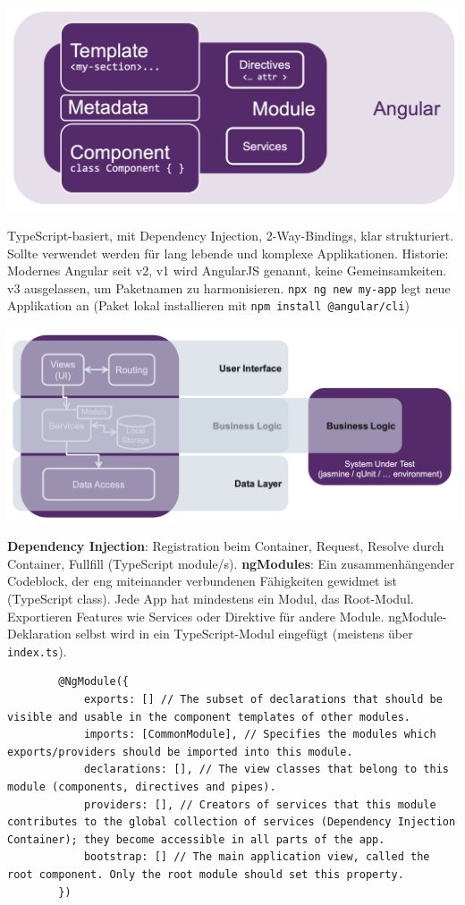 \documentclass[10pt,landscape]{article}
\begin{document}
\begin{multicols}{2}
        \includegraphics[width=\linewidth]{base_angular}

        TypeScript-basiert, mit Dependency Injection, 2-Way-Bindings, klar strukturiert.
        Sollte verwendet werden für lang lebende und komplexe Applikationen.
        Historie: Modernes Angular seit v2, v1 wird AngularJS genannt, keine Gemeinsamkeiten.
        v3 ausgelassen, um Paketnamen zu harmonisieren.
        \lstinline{npx ng new my-app} legt neue Applikation an (Paket lokal installieren mit \lstinline{npm install @angular/cli})

        \includegraphics[width=\linewidth]{angular_logical_layers}

        \textbf{Dependency Injection}: Registration beim Container, Request, Resolve durch Container, Fullfill (TypeScript module/s).
        \textbf{ngModules}: Ein zusammenhängender Codeblock, der eng miteinander verbundenen Fähigkeiten gewidmet ist (TypeScript class).
        Jede App hat mindestens ein Modul, das Root-Modul.
        Exportieren Features wie Services oder Direktive für andere Module.
        ngModule-Deklaration selbst wird in ein TypeScript-Modul eingefügt (meistens über \lstinline{index.ts}).

        \begin{lstlisting}
        @NgModule({
            exports: [] // The subset of declarations that should be visible and usable in the component templates of other modules.
            imports: [CommonModule], // Specifies the modules which exports/providers should be imported into this module.
            declarations: [], // The view classes that belong to this module (components, directives and pipes).
            providers: [], // Creators of services that this module contributes to the global collection of services (Dependency Injection Container); they become accessible in all parts of the app.
            bootstrap: [] // The main application view, called the root component. Only the root module should set this property.
        })


\end{lstlisting}
\end{multicols}
\end{document}
